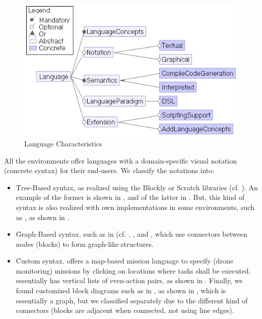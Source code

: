 \begin{figure}[t]
     \centering
    \includegraphics[width=.75\columnwidth]{Languagefeatures.png}
      \caption{Language Characteristics}
      \label{fig:languagefeatures}
   \end{figure}

 All the environments offer languages with a domain-specific visual notation (concrete syntax) for their end-users. We classify the notations into:

\begin{itemize}
	\item \f{Tree-Based} syntax, as realized using the Blockly or Scratch libraries (cf. ). An example of the former is shown in , and of the latter in . But, this kind of syntax is also realized with own implementations in some environments, such as \robotc, as shown in .
	\item \f{Graph-Based} syntax, such as in \choregraphe (cf. , %
	\robotmesh, and %
	\picaxe, which use connectors between nodes (blocks) to form graph-like structures. 
	\item \f{Custom} syntax. \flyaq offers a map-based mission language to specify (drone monitoring) missions by clicking on locations where tasks shall be executed. \aseba essentially has vertical lists of even-action pairs, as shown in . Finally, we found customized block diagrams such as in \lego, as shown in , which is essentially a graph, but we classified separately due to the different kind of connectors (blocks are adjacent when connected, not using line edges).
\end{itemize}


